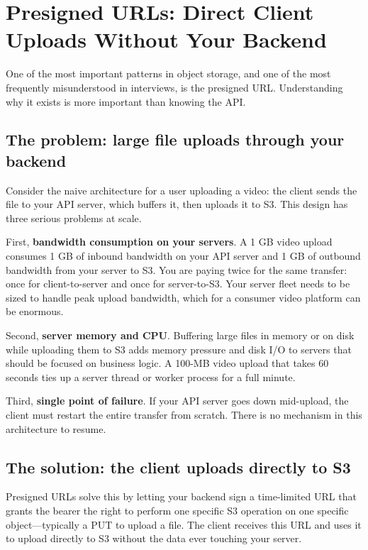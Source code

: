 \documentclass[11pt,a4paper]{article}
\begin{document}
\section{Presigned URLs: Direct Client Uploads Without Your Backend}

One of the most important patterns in object storage, and one of the most frequently misunderstood in interviews, is the presigned URL. Understanding why it exists is more important than knowing the API.

\subsection{The problem: large file uploads through your backend}

Consider the naive architecture for a user uploading a video: the client sends the file to your API server, which buffers it, then uploads it to S3. This design has three serious problems at scale.

First, \textbf{bandwidth consumption on your servers}. A 1 GB video upload consumes 1 GB of inbound bandwidth on your API server and 1 GB of outbound bandwidth from your server to S3. You are paying twice for the same transfer: once for client-to-server and once for server-to-S3. Your server fleet needs to be sized to handle peak upload bandwidth, which for a consumer video platform can be enormous.

Second, \textbf{server memory and CPU}. Buffering large files in memory or on disk while uploading them to S3 adds memory pressure and disk I/O to servers that should be focused on business logic. A 100-MB video upload that takes 60 seconds ties up a server thread or worker process for a full minute.

Third, \textbf{single point of failure}. If your API server goes down mid-upload, the client must restart the entire transfer from scratch. There is no mechanism in this architecture to resume.

\subsection{The solution: the client uploads directly to S3}

Presigned URLs solve this by letting your backend sign a time-limited URL that grants the bearer the right to perform one specific S3 operation on one specific object---typically a PUT to upload a file. The client receives this URL and uses it to upload directly to S3 without the data ever touching your server.
\end{document}
